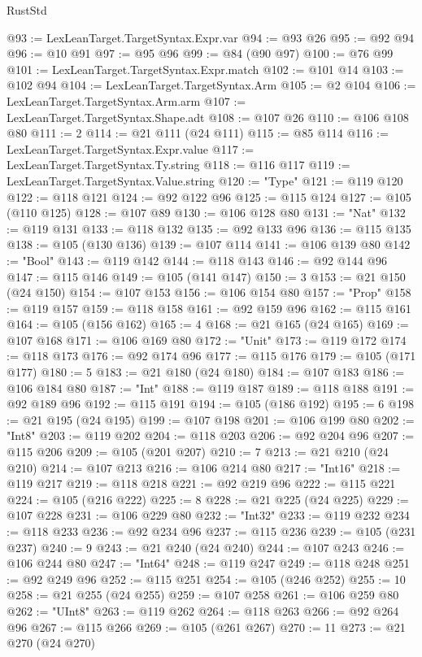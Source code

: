 \begin{lexlean}{RustStd}
\begin{coremodule}
@93 := LexLeanTarget.TargetSyntax.Expr.var
@94 := @93 @26
@95 := @92 @94
@96 := @10 @91
@97 := @95 @96
@99 := @84 (@90 @97)
@100 := @76 @99
@101 := LexLeanTarget.TargetSyntax.Expr.match
@102 := @101 @14
@103 := @102 @94
@104 := LexLeanTarget.TargetSyntax.Arm
@105 := @2 @104
@106 := LexLeanTarget.TargetSyntax.Arm.arm
@107 := LexLeanTarget.TargetSyntax.Shape.adt
@108 := @107 @26
@110 := @106 @108 @80
@111 := 2
@114 := @21 @111 (@24 @111)
@115 := @85 @114
@116 := LexLeanTarget.TargetSyntax.Expr.value
@117 := LexLeanTarget.TargetSyntax.Ty.string
@118 := @116 @117
@119 := LexLeanTarget.TargetSyntax.Value.string
@120 := "Type"
@121 := @119 @120
@122 := @118 @121
@124 := @92 @122 @96
@125 := @115 @124
@127 := @105 (@110 @125)
@128 := @107 @89
@130 := @106 @128 @80
@131 := "Nat"
@132 := @119 @131
@133 := @118 @132
@135 := @92 @133 @96
@136 := @115 @135
@138 := @105 (@130 @136)
@139 := @107 @114
@141 := @106 @139 @80
@142 := "Bool"
@143 := @119 @142
@144 := @118 @143
@146 := @92 @144 @96
@147 := @115 @146
@149 := @105 (@141 @147)
@150 := 3
@153 := @21 @150 (@24 @150)
@154 := @107 @153
@156 := @106 @154 @80
@157 := "Prop"
@158 := @119 @157
@159 := @118 @158
@161 := @92 @159 @96
@162 := @115 @161
@164 := @105 (@156 @162)
@165 := 4
@168 := @21 @165 (@24 @165)
@169 := @107 @168
@171 := @106 @169 @80
@172 := "Unit"
@173 := @119 @172
@174 := @118 @173
@176 := @92 @174 @96
@177 := @115 @176
@179 := @105 (@171 @177)
@180 := 5
@183 := @21 @180 (@24 @180)
@184 := @107 @183
@186 := @106 @184 @80
@187 := "Int"
@188 := @119 @187
@189 := @118 @188
@191 := @92 @189 @96
@192 := @115 @191
@194 := @105 (@186 @192)
@195 := 6
@198 := @21 @195 (@24 @195)
@199 := @107 @198
@201 := @106 @199 @80
@202 := "Int8"
@203 := @119 @202
@204 := @118 @203
@206 := @92 @204 @96
@207 := @115 @206
@209 := @105 (@201 @207)
@210 := 7
@213 := @21 @210 (@24 @210)
@214 := @107 @213
@216 := @106 @214 @80
@217 := "Int16"
@218 := @119 @217
@219 := @118 @218
@221 := @92 @219 @96
@222 := @115 @221
@224 := @105 (@216 @222)
@225 := 8
@228 := @21 @225 (@24 @225)
@229 := @107 @228
@231 := @106 @229 @80
@232 := "Int32"
@233 := @119 @232
@234 := @118 @233
@236 := @92 @234 @96
@237 := @115 @236
@239 := @105 (@231 @237)
@240 := 9
@243 := @21 @240 (@24 @240)
@244 := @107 @243
@246 := @106 @244 @80
@247 := "Int64"
@248 := @119 @247
@249 := @118 @248
@251 := @92 @249 @96
@252 := @115 @251
@254 := @105 (@246 @252)
@255 := 10
@258 := @21 @255 (@24 @255)
@259 := @107 @258
@261 := @106 @259 @80
@262 := "UInt8"
@263 := @119 @262
@264 := @118 @263
@266 := @92 @264 @96
@267 := @115 @266
@269 := @105 (@261 @267)
@270 := 11
@273 := @21 @270 (@24 @270)

\end{coremodule}
\end{lexlean}
